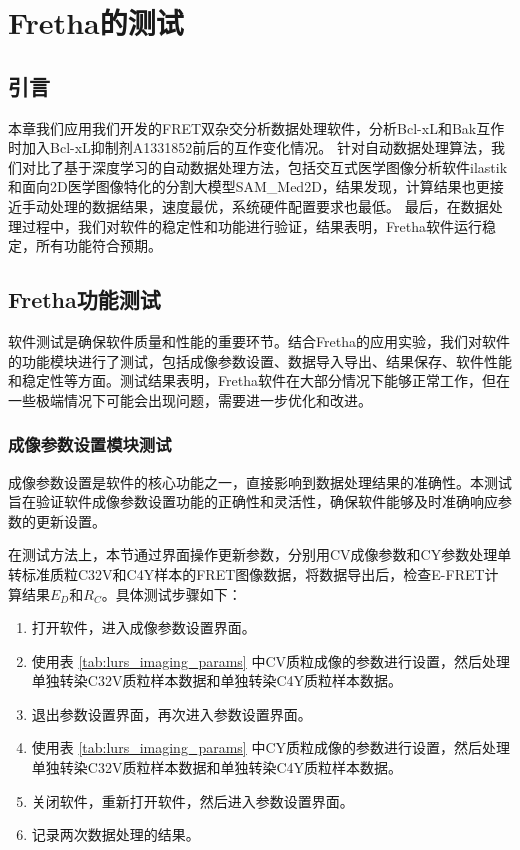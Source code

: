 \chapter{Fretha的测试}

\section{引言}
\ifshowtext

本章我们应用我们开发的FRET双杂交分析数据处理软件，分析Bcl-xL和Bak互作时加入Bcl-xL抑制剂A1331852前后的互作变化情况。
针对自动数据处理算法，我们对比了基于深度学习的自动数据处理方法，包括交互式医学图像分析软件ilastik和面向2D医学图像特化的分割大模型SAM\_Med2D，结果发现，计算结果也更接近手动处理的数据结果，速度最优，系统硬件配置要求也最低。
最后，在数据处理过程中，我们对软件的稳定性和功能进行验证，结果表明，Fretha软件运行稳定，所有功能符合预期。

\fi

\section{Fretha功能测试}
软件测试是确保软件质量和性能的重要环节。结合Fretha的应用实验，我们对软件的功能模块进行了测试，包括成像参数设置、数据导入导出、结果保存、软件性能和稳定性等方面。测试结果表明，Fretha软件在大部分情况下能够正常工作，但在一些极端情况下可能会出现问题，需要进一步优化和改进。

\subsection{成像参数设置模块测试}
成像参数设置是软件的核心功能之一，直接影响到数据处理结果的准确性。本测试旨在验证软件成像参数设置功能的正确性和灵活性，确保软件能够及时准确响应参数的更新设置。

在测试方法上，本节通过界面操作更新参数，分别用CV成像参数和CY参数处理单转标准质粒C32V和C4Y样本的FRET图像数据，将数据导出后，检查E-FRET计算结果$E_D$和$R_C$。具体测试步骤如下：
\begin{enumerate}
    \item 打开软件，进入成像参数设置界面。
    \item 使用表 \ref{tab:lurs_imaging_params} 中CV质粒成像的参数进行设置，然后处理单独转染C32V质粒样本数据和单独转染C4Y质粒样本数据。
    \item 退出参数设置界面，再次进入参数设置界面。
    \item 使用表 \ref{tab:lurs_imaging_params} 中CY质粒成像的参数进行设置，然后处理单独转染C32V质粒样本数据和单独转染C4Y质粒样本数据。
    \item 关闭软件，重新打开软件，然后进入参数设置界面。
    \item 记录两次数据处理的结果。
\end{enumerate}

